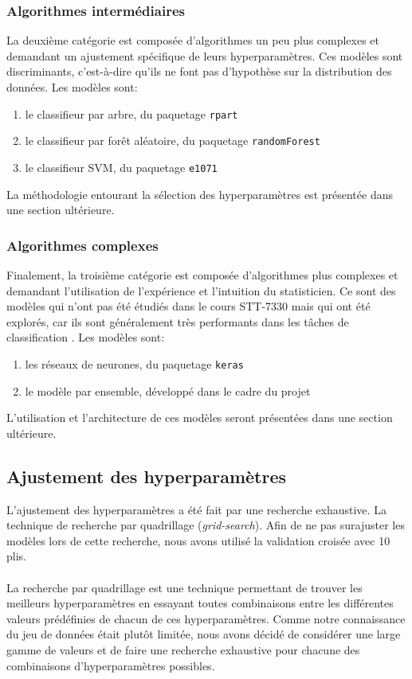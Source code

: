 \subsubsection{Algorithmes intermédiaires}
La deuxième catégorie est composée d'algorithmes un peu plus complexes et demandant un ajustement spécifique de leurs hyperparamètres. Ces modèles sont discriminants, c'est-à-dire qu'ils ne font pas d'hypothèse sur la distribution des données. Les modèles sont:

\begin{enumerate}
  \item le classifieur par arbre, du paquetage \texttt{rpart} \cite{packagerpart}
  \item le classifieur par forêt aléatoire, du paquetage \texttt{randomForest} \cite{packagerandomForest}
  \item le classifieur SVM, du paquetage \texttt{e1071} \cite{packagee1071}
\end{enumerate}

La méthodologie entourant la sélection des hyperparamètres est présentée dans une section ultérieure.

\subsubsection{Algorithmes complexes}
Finalement, la troisième catégorie est composée d'algorithmes plus complexes et demandant l'utilisation de l'expérience et l'intuition du statisticien. Ce sont des modèles qui n'ont pas été étudiés dans le cours STT-7330 mais qui ont été explorés, car ils sont généralement très performants dans les tâches de classification . Les modèles sont:

\begin{enumerate}
  \item les réseaux de neurones, du paquetage \texttt{keras} \cite{packagekeras}
  \item le modèle par ensemble, développé dans le cadre du projet
\end{enumerate}

L'utilisation et l'architecture de ces modèles seront présentées dans une section ultérieure.

\subsection{Ajustement des hyperparamètres}
L'ajustement des hyperparamètres a été fait par une recherche exhaustive. La technique de recherche par quadrillage (\textit{grid-search}). Afin de ne pas surajuster les modèles lors de cette recherche, nous avons utilisé la validation croisée avec 10 plis.\\ \\ 
La recherche par quadrillage est une technique permettant de trouver les meilleurs hyperparamètres en essayant toutes combinaisons entre les différentes valeurs prédéfinies de chacun de ces hyperparamètres. Comme notre connaissance du jeu de données était plutôt limitée, nous avons décidé de considérer une large gamme de valeurs et de faire une recherche exhaustive pour chacune des combinaisons d'hyperparamètres possibles.

